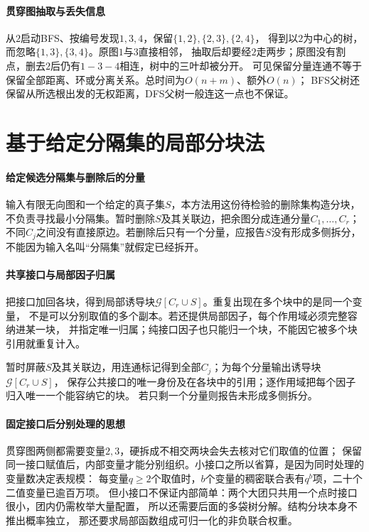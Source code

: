 \paragraph{贯穿图抽取与丢失信息}
从$2$启动BFS、按编号发现$1,3,4$，保留$\{1,2\},\{2,3\},\{2,4\}$，
得到以$2$为中心的树，而忽略$\{1,3\},\{3,4\}$。原图$1$与$3$直接相邻，
抽取后却要经$2$走两步；原图没有割点，删去$2$后仍有$1-3-4$相连，树中的三叶却被分开。
可见保留分量连通不等于保留全部距离、环或分离关系。总时间为$O(n+m)$、额外$O(n)$；
BFS父树还保留从所选根出发的无权距离，DFS父树一般连这一点也不保证。

\section{基于给定分隔集的局部分块法}
\label{sec:graph-theory-separators}

\paragraph{给定候选分隔集与删除后的分量}
输入有限无向图和一个给定的真子集$S$，本方法用这份待检验的删除集构造分块，
不负责寻找最小分隔集。暂时删除$S$及其关联边，把余图分成连通分量$C_1,\ldots,C_r$；
不同$C_j$之间没有直接原边。若删除后只有一个分量，应报告$S$没有形成多侧拆分，
不能因为输入名叫“分隔集”就假定已经拆开。

\paragraph{共享接口与局部因子归属}
把接口加回各块，得到局部诱导块$\mathcal G[C_r\cup S]$。重复出现在多个块中的是同一个变量，
不是可以分别取值的多个副本。若还提供局部因子，每个作用域必须完整容纳进某一块，
并指定唯一归属；纯接口因子也只能归一个块，不能因它被多个块引用就重复计入。
\begin{algorithm}[删除、标记与加回接口]
  暂时屏蔽$S$及其关联边，用连通标记得到全部$C_j$；为每个分量输出诱导块$\mathcal G[C_r\cup S]$，
  保存公共接口的唯一身份及在各块中的引用；逐作用域把每个因子归入唯一一个能容纳它的块。
  若只剩一个分量则报告未形成多侧拆分。
\end{algorithm}

\paragraph{固定接口后分别处理的思想}
贯穿图两侧都需要变量$2,3$，硬拆成不相交两块会失去核对它们取值的位置；
保留同一接口赋值后，内部变量才能分别组织。小接口之所以省算，是因为同时处理的变量数决定表规模：
每变量$q\geq2$个取值时，$b$个变量的稠密联合表有$q^b$项，二十个二值变量已逾百万项。
但小接口不保证内部简单：两个大团只共用一个点时接口很小，团内仍需枚举大量配置，
所以还需要后面的多袋树分解。结构分块本身不推出概率独立，
那还要求局部函数组成可归一化的非负联合权重。

